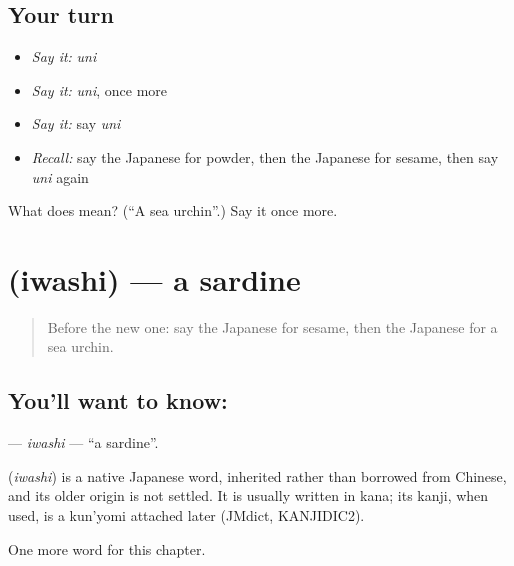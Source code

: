 \subsection*{Your turn}
\begin{itemize}
\raggedright
  \item \emph{Say it:} \emph{uni}
  \item \emph{Say it:} \emph{uni}, once more
  \item \emph{Say it:} say \emph{uni}
  \item \emph{Recall:} say the Japanese for powder, then the Japanese for sesame, then say \emph{uni} again
\end{itemize}

\begin{tcolorbox}[breakable,colback=teal!4,colframe=teal!35!black,title={Before you move on}]
What does  mean? (\textquotedblleft{}A sea urchin\textquotedblright{}.) Say it once more.
\end{tcolorbox}
\section[\texorpdfstring{\ja{いわし} (iwashi)}{いわし (iwashi)}]{ (iwashi) — a sardine}

\label{lesson:JA-C64-iwashi}



\begin{quote}
Before the new one: say the Japanese for sesame, then the Japanese for a sea urchin.
\end{quote}

\subsection*{You'll want to know: }
\textbf{} — \emph{iwashi} — \textquotedblleft{}a sardine\textquotedblright{}.

\begin{cousinweb}
\textbf{} (\emph{iwashi}) is a native Japanese word, inherited rather than borrowed from Chinese, and its older origin is not settled. It is usually written in kana; its kanji, when used, is a kun'yomi attached later (JMdict, KANJIDIC2).
\end{cousinweb}

\begin{grammarlens}[title={What you've built}]
One more word for this chapter.
\end{grammarlens}

